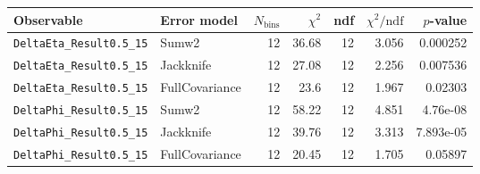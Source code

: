 \begin{tabular}{|l|l|r|r|r|r|r|}
\hline
Observable & Error model & $N_{\mathrm{bins}}$ & $\chi^2$ & ndf & $\chi^2/\mathrm{ndf}$ & $p$-value \\
\hline
\texttt{DeltaEta\_Result0.5\_15} & Sumw2 & 12 & 36.68 & 12 & 3.056 & 0.000252 \\
\texttt{DeltaEta\_Result0.5\_15} & Jackknife & 12 & 27.08 & 12 & 2.256 & 0.007536 \\
\texttt{DeltaEta\_Result0.5\_15} & FullCovariance & 12 & 23.6 & 12 & 1.967 & 0.02303 \\
\texttt{DeltaPhi\_Result0.5\_15} & Sumw2 & 12 & 58.22 & 12 & 4.851 & 4.76e-08 \\
\texttt{DeltaPhi\_Result0.5\_15} & Jackknife & 12 & 39.76 & 12 & 3.313 & 7.893e-05 \\
\texttt{DeltaPhi\_Result0.5\_15} & FullCovariance & 12 & 20.45 & 12 & 1.705 & 0.05897 \\
\hline
\end{tabular}
